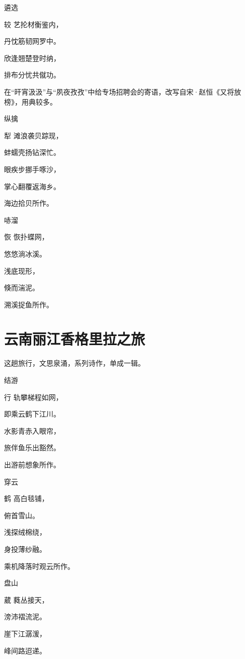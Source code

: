 \documentclass{article}
\newenvironment{poem}[3]{
\begin{minipage}{\textwidth}
\begin{pinyinscope}\begin{center}\Large\linespread{1.4}\selectfont #2\end{center}\end{pinyinscope}
\begin{pinyinscope}
	\begin{center}
	\Large\linespread{1.4}\rmfamily\selectfont #3
}{\end{center}
\end{pinyinscope}
\end{minipage}
}
\begin{document}
\begin{poem}{}{遴选}
较艺抡材衡鉴内，

丹忱筋韧网罗中。

欣逢翘楚登时纳，

排布分忧共僦功。
\end{poem}

在“旰宵汲汲”与“夙夜孜孜”中给专场招聘会的寄语，改写自宋·赵恒《又将放榜》，用典较多。

\begin{poem}{}{纵擒}
犁滩浪袭贝踪现，

蚌蠕壳扬钻深忙。

眼疾步挪手啄沙，

掌心翻覆返海乡。
\end{poem}

海边拾贝所作。

\begin{poem}{}{哧溜}
恢恢扑蝶网，

悠悠淌冰溪。

浅底现形{}，

倏而{}湍泥。
\end{poem}

溯溪捉鱼所作。

\section{云南丽江香格里拉之旅}

这趟旅行，文思泉涌，系列诗作，单成一辑。

\begin{poem}{}{结游}
行轨攀梯程如网，

即乘云鹤下江川。

水影青赤入眼帘，

旅伴鱼乐出豁然。
\end{poem}

出游前想象所作。

\bigbreak

\begin{poem}{}{穿云}
鹤高白毯铺，

俯首雪山{}。

浅探绒棉绕，

身投薄纱融。
\end{poem}

乘机降落时观云所作。

\bigbreak

\begin{poem}{}{盘山}
葳蕤丛接天，

滂沛褶流泥。

崖下江潺{\textsf 湲}，

峰间路迢递。
\end{poem}
\end{document}
